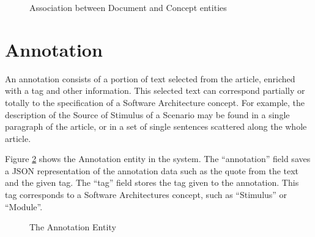 \begin{figure}[h]
\centering
\renewcommand {\umltextcolor}{black}
\renewcommand {\umlfillcolor}{none}
\renewcommand {\umldrawcolor}{black}

\caption{Association between Document and Concept entities}
\label{figure:documentConcept}
\end{figure}

\section{Annotation}
\label{section:annotation}

An annotation consists of a portion of text selected from the article, enriched with a tag and other information. This selected text can correspond partially or totally to the specification of a Software Architecture concept. For example, the description of the Source of Stimulus of a Scenario may be found in a single paragraph of the article, or in a set of single sentences scattered along the whole article. 

Figure \ref{figure:annotationEntity} shows the Annotation entity in the system. The ``annotation'' field saves a JSON representation of the annotation data such as the quote from the text and the given tag. The ``tag'' field stores the tag given to the annotation. This tag corresponds to a Software Architectures concept, such as ``Stimulus'' or ``Module''.

\begin{figure}[h]
\centering
\renewcommand {\umltextcolor}{black}
\renewcommand {\umlfillcolor}{none}
\renewcommand {\umldrawcolor}{black}

\caption{The Annotation Entity}
\label{figure:annotationEntity}
\end{figure}

